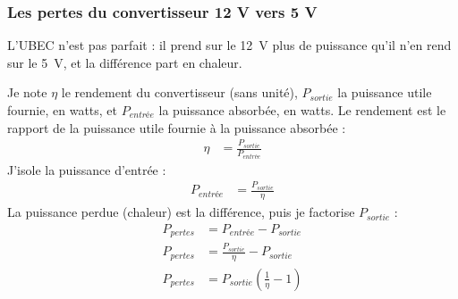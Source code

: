 \subsubsection*{Les pertes du convertisseur 12 V vers 5 V}

L'UBEC n'est pas parfait : il prend sur le \qty{12}{V} plus de puissance qu'il n'en rend sur le \qty{5}{V}, et la différence part en chaleur.

\begin{demonstration}
Je note $\eta$ le rendement du convertisseur (sans unité), $P_{sortie}$ la puissance utile fournie, en watts, et $P_{entrée}$ la puissance absorbée, en watts. Le rendement est le rapport de la puissance utile fournie à la puissance absorbée :
\begin{align*}
\eta &= \frac{P_{sortie}}{P_{entrée}}
\end{align*}
J'isole la puissance d'entrée :
\begin{align*}
P_{entrée} &= \frac{P_{sortie}}{\eta}
\end{align*}
La puissance perdue (chaleur) est la différence, puis je factorise $P_{sortie}$ :
\begin{align*}
P_{pertes} &= P_{entrée} - P_{sortie}\\
P_{pertes} &= \frac{P_{sortie}}{\eta} - P_{sortie}\\
P_{pertes} &= P_{sortie}\left(\frac{1}{\eta} - 1\right)
\end{align*}
\end{demonstration}

